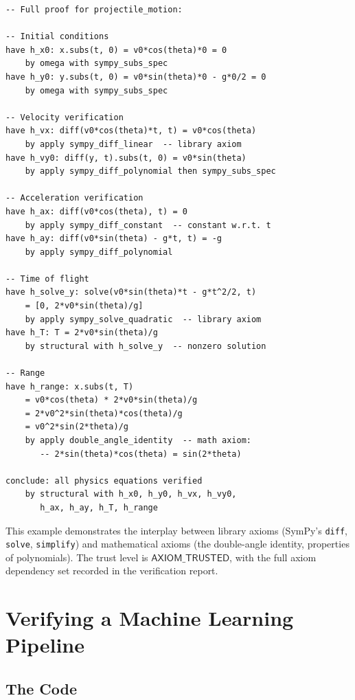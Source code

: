\documentclass[11pt,a4paper]{report}
\theoremstyle{definition}
\theoremstyle{plain}
\begin{document}
\begin{lstlisting}[style=proof]
-- Full proof for projectile_motion:

-- Initial conditions
have h_x0: x.subs(t, 0) = v0*cos(theta)*0 = 0
    by omega with sympy_subs_spec
have h_y0: y.subs(t, 0) = v0*sin(theta)*0 - g*0/2 = 0
    by omega with sympy_subs_spec

-- Velocity verification
have h_vx: diff(v0*cos(theta)*t, t) = v0*cos(theta)
    by apply sympy_diff_linear  -- library axiom
have h_vy0: diff(y, t).subs(t, 0) = v0*sin(theta)
    by apply sympy_diff_polynomial then sympy_subs_spec

-- Acceleration verification
have h_ax: diff(v0*cos(theta), t) = 0
    by apply sympy_diff_constant  -- constant w.r.t. t
have h_ay: diff(v0*sin(theta) - g*t, t) = -g
    by apply sympy_diff_polynomial

-- Time of flight
have h_solve_y: solve(v0*sin(theta)*t - g*t^2/2, t)
    = [0, 2*v0*sin(theta)/g]
    by apply sympy_solve_quadratic  -- library axiom
have h_T: T = 2*v0*sin(theta)/g
    by structural with h_solve_y  -- nonzero solution

-- Range
have h_range: x.subs(t, T)
    = v0*cos(theta) * 2*v0*sin(theta)/g
    = 2*v0^2*sin(theta)*cos(theta)/g
    = v0^2*sin(2*theta)/g
    by apply double_angle_identity  -- math axiom:
       -- 2*sin(theta)*cos(theta) = sin(2*theta)

conclude: all physics equations verified
    by structural with h_x0, h_y0, h_vx, h_vy0,
       h_ax, h_ay, h_T, h_range
\end{lstlisting}

This example demonstrates the interplay between library axioms (SymPy's
\texttt{diff}, \texttt{solve}, \texttt{simplify}) and mathematical axioms
(the double-angle identity, properties of polynomials).  The trust level
is $\mathsf{AXIOM\_TRUSTED}$, with the full axiom dependency set recorded
in the verification report.


\chapter{Verifying a Machine Learning Pipeline}
\label{ch:case-ml}

\section{The Code}
\end{document}
